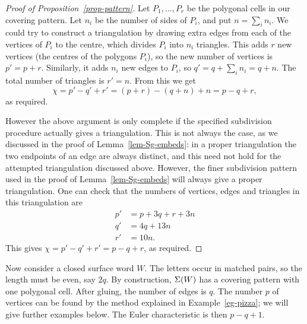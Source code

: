 \documentclass[reqno]{amsart}
\theoremstyle{definition}
\begin{document}
\begin{proof}[Proof of Proposition~\ref{prop-pattern}]
 Let $P_1,\dotsc,P_r$ be the polygonal cells in our covering pattern.
 Let $n_i$ be the number of sides of $P_i$, and put $n=\sum_in_i$.  We
 could try to construct a triangulation by drawing extra edges from
 each of the vertices of $P_i$ to the centre, which divides $P_i$ into
 $n_i$ triangles.  This adds $r$ new vertices (the centres of the
 polygons $P_i$), so the new number of vertices is $p'=p+r$.
 Similarly, it adds $n_i$ new edges to $P_i$, so $q'=q+\sum_in_i=q+n$.
 The total number of triangles is $r'=n$.  From this we get
 \[ \chi=p'-q'+r'=(p+r)-(q+n)+n = p-q+r, \]
 as required.

 However the above argument is only complete if the specified
 subdivision procedure actually gives a triangulation.  This is not
 always the case, as we discussed in the proof of
 Lemma~\ref{lem-Sg-embeds}: in a proper triangulation the two
 endpoints of an edge are always distinct, and this need not hold for
 the attempted triangulation discussed above.  However, the finer
 subdivision pattern used in the proof of Lemma~\ref{lem-Sg-embeds}
 will always give a proper triangulation.  One can check that the
 numbers of vertices, edges and triangles in this triangulation are
 \begin{align*}
  p' &= p + 3q + r + 3n \\
  q' &= 4q + 13n \\
  r' &= 10n.
 \end{align*}
 This gives $\chi=p'-q'+r'=p-q+r$, as required.
\end{proof}

Now consider a closed surface word $W$.  The letters occur in matched
pairs, so the length must be even, say $2q$.  By construction,
$\Sigma(W)$ has a covering pattern with one polygonal cell.  After
gluing, the number of edges is $q$.  The number $p$ of vertices can be
found by the method explained in Example~\ref{eg-pizza}; we will give
further examples below.  The Euler characteristic is then $p-q+1$.
\end{document}
